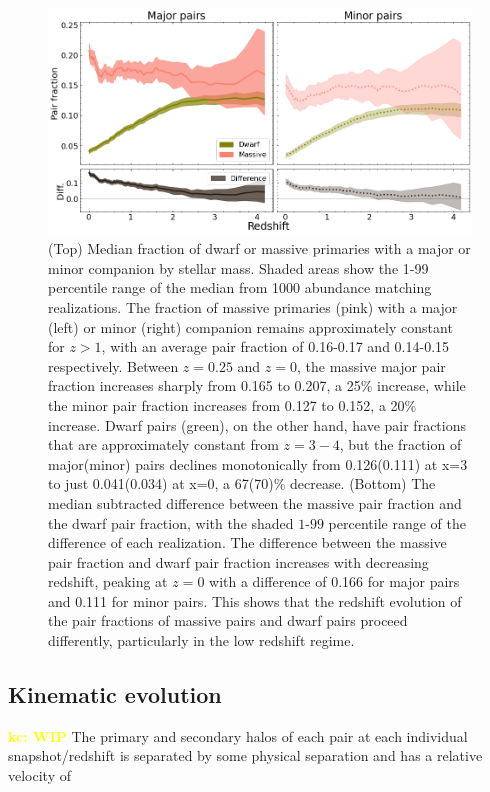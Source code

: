 \documentclass[twocolumn]{aastex631}
\newcommand{\kc}[1]{\textcolor{yellow}{\textbf{kc: #1}} }
\begin{document}
\label{sec:results}
\begin{figure}[htp]
  \centering
  \includegraphics[width=\textwidth]{pairratio_1000.png}
  \caption{
    (Top) Median fraction of dwarf or massive primaries with a major or minor companion by stellar mass. 
    Shaded areas show the 1-99 percentile range of the median from 1000 abundance matching realizations. 
    The fraction of massive primaries (pink) with a major (left) or minor (right) companion remains approximately constant for $z>1$, with an average pair fraction of 0.16-0.17 and 0.14-0.15 respectively. Between $z=0.25$ and $z=0$, the massive major pair fraction increases sharply from 0.165 to 0.207, a 25\% increase, while the minor pair fraction increases from 0.127 to 0.152, a 20\% increase.
    Dwarf pairs (green), on the other hand, have pair fractions that are approximately constant from $z=3-4$, but the fraction of major(minor) pairs declines monotonically from 0.126(0.111) at x=3 to just 0.041(0.034) at x=0, a 67(70)\% decrease. 
  (Bottom) The median subtracted difference between the massive pair fraction and the dwarf pair fraction, with the shaded $1$-$99$ percentile range of the difference of each realization. The difference between the massive pair fraction and dwarf pair fraction increases with decreasing redshift, peaking at $z=0$ with a difference of 0.166 for major pairs and 0.111 for minor pairs. This shows that the redshift evolution of the pair fractions of massive pairs and dwarf pairs proceed differently, particularly in the low redshift regime.}
  \label{fig:pairratio}
\end{figure}

\subsection{Kinematic evolution}\label{sec:results-kinematics}
\kc{WIP}
The primary and secondary halos of each pair at each individual snapshot/redshift is separated by some physical separation and has a relative velocity of 
\end{document}
